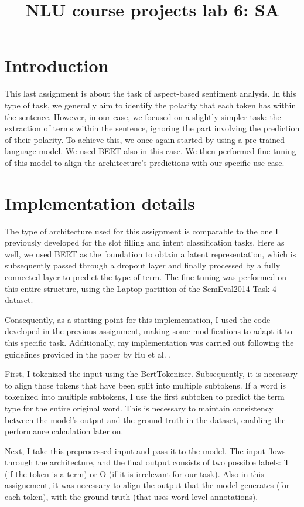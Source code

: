\documentclass[a4paper]{article}
\title{NLU course projects lab 6: SA}
\begin{document}
\maketitle

\section{Introduction}
This last assignment is about the task of aspect-based sentiment analysis.
In this type of task, we generally aim to identify the polarity that each token has within the sentence. However, in our case, we focused on a slightly simpler task: the extraction of terms within the sentence, ignoring the part involving the prediction of their polarity.
To achieve this, we once again started by using a pre-trained language model. We used BERT also in this case. We then performed fine-tuning of this model to align the architecture’s predictions with our specific use case.

\section{Implementation details}
The type of architecture used for this assignment is comparable to the one I previously developed for the slot filling and intent classification tasks.
Here as well, we used BERT as the foundation to obtain a latent representation, which is subsequently passed through a dropout layer and finally processed by a fully connected layer to predict the type of term. The fine-tuning was performed on this entire structure, using the Laptop partition of the SemEval2014 Task 4 dataset.

Consequently, as a starting point for this implementation, I used the code developed in the previous assignment, making some modifications to adapt it to this specific task.
Additionally, my implementation was carried out following the guidelines provided in the paper by Hu et al. \cite{hu2019opendomaintargetedsentimentanalysis}.

First, I tokenized the input using the BertTokenizer. Subsequently, it is necessary to align those tokens that have been split into multiple subtokens. If a word is tokenized into multiple subtokens, I use the first subtoken to predict the term type for the entire original word. This is necessary to maintain consistency between the model’s output and the ground truth in the dataset, enabling the performance calculation later on.

Next, I take this preprocessed input and pass it to the model. The input flows through the architecture, and the final output consists of two possible labels: T (if the token is a term) or O (if it is irrelevant for our task).
Also in this assignement, it was necessary to align the output that the model generates (for each token), with the ground truth (that uses word-level annotations). 
\end{document}

